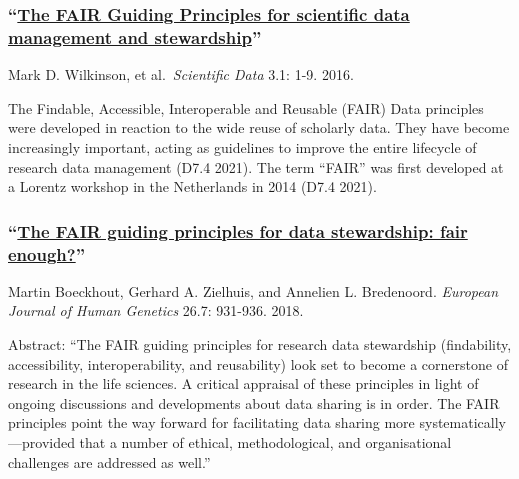 \documentclass[
]{book}
\begin{document}
\hypertarget{the-fair-guiding-principles-for-scientific-data-management-and-stewardship}{%
\subsubsection*{\texorpdfstring{``\href{https://www.nature.com/articles/sdata201618}{The FAIR Guiding Principles for scientific data management and stewardship}''}{``The FAIR Guiding Principles for scientific data management and stewardship''}}\label{the-fair-guiding-principles-for-scientific-data-management-and-stewardship}}

Mark D. Wilkinson, et al.~\emph{Scientific Data} 3.1: 1-9. 2016.

The Findable, Accessible, Interoperable and Reusable (FAIR) Data principles were developed in reaction to the wide reuse of scholarly data. They have become increasingly important, acting as guidelines to improve the entire lifecycle of research data management (D7.4 2021). The term ``FAIR'' was first developed at a Lorentz workshop in the Netherlands in 2014 (D7.4 2021).

\hypertarget{the-fair-guiding-principles-for-data-stewardship-fair-enough}{%
\subsubsection*{\texorpdfstring{``\href{https://www.ncbi.nlm.nih.gov/pmc/articles/PMC6018669/}{The FAIR guiding principles for data stewardship: fair enough?}''}{``The FAIR guiding principles for data stewardship: fair enough?''}}\label{the-fair-guiding-principles-for-data-stewardship-fair-enough}}

Martin Boeckhout, Gerhard A. Zielhuis, and Annelien L. Bredenoord. \emph{European Journal of Human Genetics} 26.7: 931-936. 2018.

Abstract: ``The FAIR guiding principles for research data stewardship (findability, accessibility, interoperability, and reusability) look set to become a cornerstone of research in the life sciences. A critical appraisal of these principles in light of ongoing discussions and developments about data sharing is in order. The FAIR principles point the way forward for facilitating data sharing more systematically---provided that a number of ethical, methodological, and organisational challenges are addressed as well.''
\end{document}
